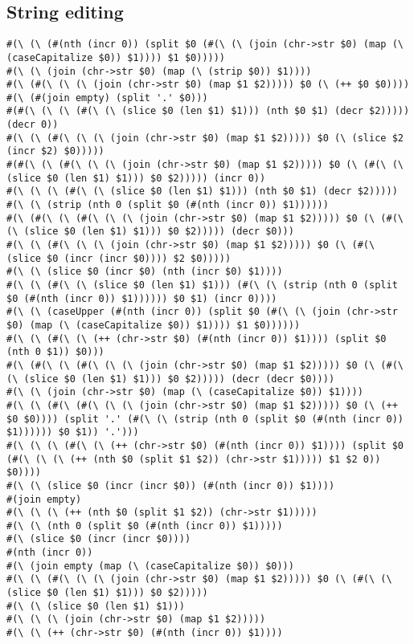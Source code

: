 \documentclass{article}
\begin{document}
\subsection{String editing}
\begin{lstlisting}[breaklines=true]
#(\ (\ (#(nth (incr 0)) (split $0 (#(\ (\ (join (chr->str $0) (map (\ (caseCapitalize $0)) $1)))) $1 $0)))))
#(\ (\ (join (chr->str $0) (map (\ (strip $0)) $1))))
#(\ (#(\ (\ (\ (join (chr->str $0) (map $1 $2))))) $0 (\ (++ $0 $0))))
#(\ (#(join empty) (split '.' $0)))
#(#(\ (\ (\ (#(\ (\ (slice $0 (len $1) $1))) (nth $0 $1) (decr $2))))) (decr 0))
#(\ (\ (#(\ (\ (\ (join (chr->str $0) (map $1 $2))))) $0 (\ (slice $2 (incr $2) $0)))))
#(#(\ (\ (#(\ (\ (\ (join (chr->str $0) (map $1 $2))))) $0 (\ (#(\ (\ (slice $0 (len $1) $1))) $0 $2))))) (incr 0))
#(\ (\ (\ (#(\ (\ (slice $0 (len $1) $1))) (nth $0 $1) (decr $2)))))
#(\ (\ (strip (nth 0 (split $0 (#(nth (incr 0)) $1))))))
#(\ (#(\ (\ (#(\ (\ (\ (join (chr->str $0) (map $1 $2))))) $0 (\ (#(\ (\ (slice $0 (len $1) $1))) $0 $2))))) (decr $0)))
#(\ (\ (#(\ (\ (\ (join (chr->str $0) (map $1 $2))))) $0 (\ (#(\ (slice $0 (incr (incr $0)))) $2 $0)))))
#(\ (\ (slice $0 (incr $0) (nth (incr $0) $1))))
#(\ (\ (#(\ (\ (slice $0 (len $1) $1))) (#(\ (\ (strip (nth 0 (split $0 (#(nth (incr 0)) $1)))))) $0 $1) (incr 0))))
#(\ (\ (caseUpper (#(nth (incr 0)) (split $0 (#(\ (\ (join (chr->str $0) (map (\ (caseCapitalize $0)) $1)))) $1 $0))))))
#(\ (\ (#(\ (\ (++ (chr->str $0) (#(nth (incr 0)) $1)))) (split $0 (nth 0 $1)) $0)))
#(\ (#(\ (\ (#(\ (\ (\ (join (chr->str $0) (map $1 $2))))) $0 (\ (#(\ (\ (slice $0 (len $1) $1))) $0 $2))))) (decr (decr $0))))
#(\ (\ (join (chr->str $0) (map (\ (caseCapitalize $0)) $1))))
#(\ (\ (#(\ (#(\ (\ (\ (join (chr->str $0) (map $1 $2))))) $0 (\ (++ $0 $0)))) (split '.' (#(\ (\ (strip (nth 0 (split $0 (#(nth (incr 0)) $1)))))) $0 $1)) '.')))
#(\ (\ (\ (#(\ (\ (++ (chr->str $0) (#(nth (incr 0)) $1)))) (split $0 (#(\ (\ (\ (++ (nth $0 (split $1 $2)) (chr->str $1))))) $1 $2 0)) $0))))
#(\ (\ (slice $0 (incr (incr $0)) (#(nth (incr 0)) $1))))
#(join empty)
#(\ (\ (\ (++ (nth $0 (split $1 $2)) (chr->str $1)))))
#(\ (\ (nth 0 (split $0 (#(nth (incr 0)) $1)))))
#(\ (slice $0 (incr (incr $0))))
#(nth (incr 0))
#(\ (join empty (map (\ (caseCapitalize $0)) $0)))
#(\ (\ (#(\ (\ (\ (join (chr->str $0) (map $1 $2))))) $0 (\ (#(\ (\ (slice $0 (len $1) $1))) $0 $2)))))
#(\ (\ (slice $0 (len $1) $1)))
#(\ (\ (\ (join (chr->str $0) (map $1 $2)))))
#(\ (\ (++ (chr->str $0) (#(nth (incr 0)) $1))))
\end{lstlisting}
\end{document}

